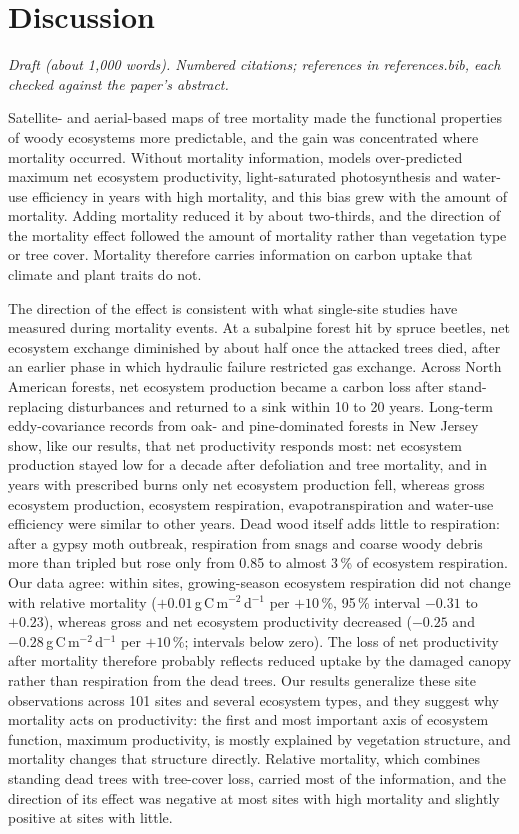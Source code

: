 \documentclass[11pt,a4paper]{article}
\begin{document}
\section*{Discussion}
{\small\textit{Draft (about 1,000 words). Numbered citations; references in references.bib, each checked against the
paper's abstract.}}

Satellite- and aerial-based maps of tree mortality made the functional properties of woody ecosystems more predictable, and
the gain was concentrated where mortality occurred. Without mortality information, models over-predicted maximum net
ecosystem productivity, light-saturated photosynthesis and water-use efficiency in years with high mortality, and this
bias grew with the amount of mortality. Adding mortality reduced it by about two-thirds,
and the direction of the mortality effect followed the amount of mortality rather than vegetation type or tree cover.
Mortality therefore carries information on carbon uptake that climate and plant traits do not.

The direction of the effect is consistent with what single-site studies have measured during mortality events. At a
subalpine forest hit by spruce beetles, net ecosystem exchange diminished by about half once the attacked trees died,
after an earlier phase in which hydraulic failure restricted gas exchange\cite{frank2014ecosystem}. Across North
American forests, net ecosystem production became a carbon loss after stand-replacing disturbances and returned to a
sink within 10 to 20 years\cite{amiro2010ecosystem}. Long-term eddy-covariance records from oak- and pine-dominated forests in
New Jersey show, like our results, that net productivity responds most: net ecosystem production stayed low for a decade
after defoliation and tree mortality, and in years with prescribed burns only net ecosystem production fell, whereas
gross ecosystem production, ecosystem respiration, evapotranspiration and water-use efficiency were similar to other
years\cite{clark2023carbon}. Dead wood itself adds little to respiration: after a gypsy moth outbreak, respiration from
snags and coarse woody debris more than tripled but rose only from 0.85 to almost 3\,\% of ecosystem
respiration\cite{renninger2014modeling}. Our data agree: within sites, growing-season ecosystem respiration did not change with
relative mortality ($+0.01$\,g\,C\,m$^{-2}$\,d$^{-1}$ per $+10$\,\%, 95\,\% interval $-0.31$ to $+0.23$), whereas gross and net
ecosystem productivity decreased ($-0.25$ and $-0.28$\,g\,C\,m$^{-2}$\,d$^{-1}$ per $+10$\,\%; intervals below zero). The loss of
net productivity after mortality therefore probably reflects reduced uptake by the damaged canopy rather than respiration
from the dead trees. Our results generalize these site observations across 101 sites
and several ecosystem types, and they suggest why mortality acts on productivity: the first and most important axis of
ecosystem function, maximum productivity, is mostly explained by vegetation structure\cite{migliavacca2021three}, and
mortality changes that structure directly. Relative mortality, which combines standing dead trees with tree-cover loss,
carried most of the information, and the direction of its effect was negative at most sites with high mortality and
slightly positive at sites with little.
\end{document}
